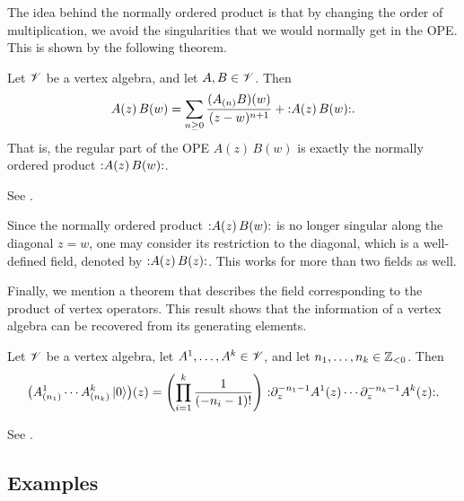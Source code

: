 The idea behind the normally ordered product is that
by changing the order of multiplication,
we avoid the singularities that we would
normally get in the OPE.
This is shown by the following theorem.

\begin{theorem}
    Let $\mathscr{V}$ be a vertex algebra, and let $A, B \in \mathscr{V}$. Then
    \[
        A (z) \, B (w) =
        \sum_{n \geq 0} \frac {(A_{(n)} B)(w)} {(z - w)^{n + 1}}
        + \mathopen{:}A (z) \, B (w)\mathclose{:}.
    \]
    That is, the regular part of the OPE $A (z) \, B (w)$
    is exactly the normally ordered product $\mathopen{:}A (z) \, B (w)\mathclose{:}$.
\end{theorem}

See \cite[\S3.3.6]{frenkel-ben-zvi}.

Since the normally ordered product $\mathopen{:}A (z) \, B (w)\mathclose{:}$
is no longer singular along the diagonal $z = w$,
one may consider its restriction to the diagonal,
which is a well-defined field,
denoted by $\mathopen{:}A (z) \, B (z)\mathclose{:}$.
This works for more than two fields as well.

Finally, we mention a theorem
that describes the field corresponding to
the product of vertex operators.
This result shows that the information of a vertex algebra
can be recovered from its generating elements.

\begin{theorem}
    \label{thm-structure}
    Let $\mathscr{V}$ be a vertex algebra, let $A^1, \dotsc, A^k \in \mathscr{V}$,
    and let $n_1, \dotsc, n_k \in \mathbb{Z}_{<0}$. Then
    \[
        \bigl( A^1_{(n_1)} \cdots A^k_{(n_k)} \ket{0} \bigr) (z) =
        \Biggl( \prod_{i=1}^k \frac{1}{(-n_i - 1)!} \Biggr) \ 
        \nord{ \partial_z^{-n_1 - 1} A^1 (z) \cdots \partial_z^{-n_k - 1} A^k (z) }.
    \]
\end{theorem}

See \cite[Corollary~4.4]{kac}.


\subsection{Examples}
\label{sect-voa-examples}

